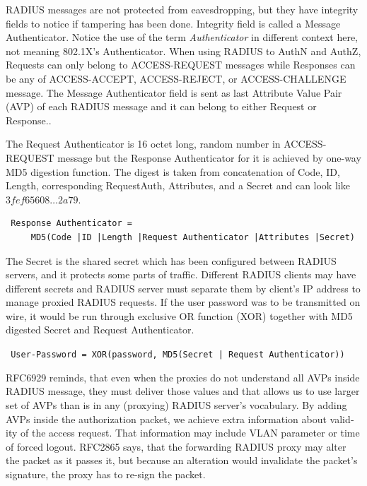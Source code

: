 \documentclass[12pt,a4paper,english]{tutthesis}
\begin{document}
\begin{otherlanguage}{english}
RADIUS messages are not protected from eavesdropping, but they have
integrity fields to notice if tampering has been done.  
Integrity field is called a Message Authenticator.
Notice the use of the term \emph{Authenticator} in different context here, not
meaning 802.1X's Authenticator.
When using RADIUS to AuthN and AuthZ, Requests can only belong to ACCESS-REQUEST messages while
Responses can be any of ACCESS-ACCEPT, ACCESS-REJECT, or ACCESS-CHALLENGE message.
The Message Authenticator field is sent as last Attribute Value Pair (AVP)
of each RADIUS message and it can belong 
to either Request or Response.\cite[p.20]{radiusbook}.

The Request Authenticator is 16 octet long, random number in
ACCESS-REQUEST message but the Response Authenticator for it is achieved
by one-way MD5 digestion function. 
The digest is taken from concatenation of Code, ID, Length, corresponding
Request\-Auth, Attributes, and a Secret and can look like 
$3fef65608\ldots 2a79$. 
\begin{verbatim}
 Response Authenticator = 
     MD5(Code |ID |Length |Request Authenticator |Attributes |Secret)
\end{verbatim}
The Secret is the shared secret which has been configured between RADIUS servers,
and it protects some parts of traffic. 
Different RADIUS clients may have different
secrets and RADIUS server must separate them by client's IP address to
manage proxied RADIUS requests\cite{radiusbook}.
If the user password was to be transmitted on wire, it would be run
through exclusive OR function (XOR) together with MD5 digested Secret
and Request
Authenticator.
\begin{center}
{\tt 
User-Password = XOR(password, MD5(Secret | Request Authenticator))}
\end{center}








RFC6929\cite{rfc6929} reminds, that even when
the proxies do not understand all AVPs inside RADIUS message, they
must deliver those values and that allows us to use larger set of AVPs 
than is in any (proxying) RADIUS server's vocabulary.
By adding AVPs inside the authorization packet, we achieve extra
information about validity of the access request.
That information may include VLAN parameter or time of forced
logout.
RFC2865\cite{rfc2865} says, that the forwarding RADIUS proxy may alter
the packet as it passes it, but because an alteration would invalidate the
packet's signature, the proxy has to re-sign the packet.





\end{otherlanguage}
\end{document}
